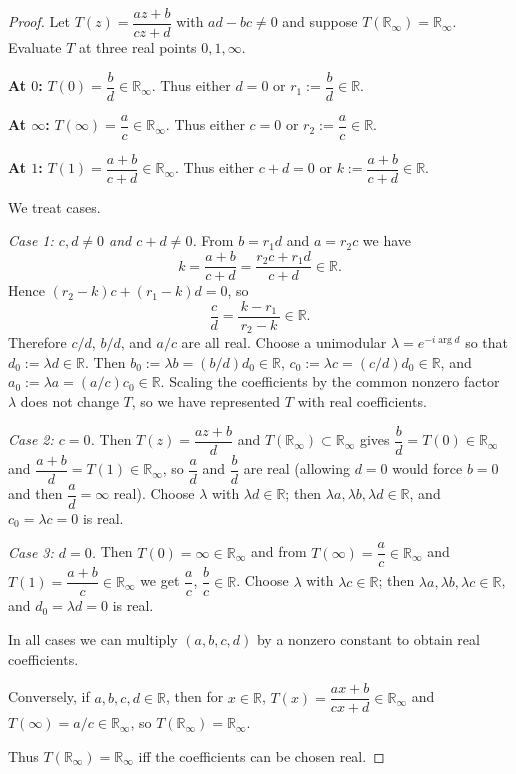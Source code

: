 \documentclass[12pt, a4paper]{report}
\theoremstyle{spaced}
\begin{document}
\begin{proof}
	Let \(T(z)=\dfrac{az+b}{cz+d}\) with \(ad-bc\neq0\) and suppose
	\(T(\mathbb{R}_\infty)=\mathbb{R}_\infty\).
	Evaluate \(T\) at three real points \(0,1,\infty\).

	\smallskip
	\textbf{At \(0\):} \quad \(T(0)=\dfrac{b}{d}\in\mathbb{R}_\infty\).
	Thus either \(d=0\) or \(r_1:=\dfrac{b}{d}\in\mathbb{R}\).

	\textbf{At \(\infty\):} \quad \(T(\infty)=\dfrac{a}{c}\in\mathbb{R}_\infty\).
	Thus either \(c=0\) or \(r_2:=\dfrac{a}{c}\in\mathbb{R}\).

	\textbf{At \(1\):} \quad \(T(1)=\dfrac{a+b}{c+d}\in\mathbb{R}_\infty\).
	Thus either \(c+d=0\) or \(k:=\dfrac{a+b}{c+d}\in\mathbb{R}\).

	We treat cases.

	\medskip
	\emph{Case 1: \(c,d\neq0\) and \(c+d\neq0\).}
	From \(b=r_1 d\) and \(a=r_2 c\) we have
	\[
		k=\frac{a+b}{c+d}=\frac{r_2 c+r_1 d}{c+d}\in\mathbb{R}.
	\]
	Hence \((r_2-k)c+(r_1-k)d=0\), so
	\[
		\frac{c}{d}=\frac{k-r_1}{\,r_2-k\,}\in\mathbb{R}.
	\]
	Therefore \(c/d\), \(b/d\), and \(a/c\) are all real.  Choose a unimodular
	\(\lambda=e^{-i\arg d}\) so that \(d_0:=\lambda d\in\mathbb{R}\).
	Then \(b_0:=\lambda b=(b/d)d_0\in\mathbb{R}\), \(c_0:=\lambda c=(c/d)d_0\in\mathbb{R}\),
	and \(a_0:=\lambda a=(a/c)c_0\in\mathbb{R}\).
	Scaling the coefficients by the common nonzero factor \(\lambda\) does not change \(T\),
	so we have represented \(T\) with real coefficients.

	\medskip
	\emph{Case 2: \(c=0\).}
	Then \(T(z)=\dfrac{az+b}{d}\) and \(T(\mathbb{R}_\infty)\subset\mathbb{R}_\infty\) gives
	\(\dfrac{b}{d}=T(0)\in\mathbb{R}_\infty\) and \(\dfrac{a+b}{d}=T(1)\in\mathbb{R}_\infty\),
	so \(\dfrac{a}{d}\) and \(\dfrac{b}{d}\) are real (allowing \(d=0\) would force \(b=0\) and then
	\(\dfrac{a}{d}=\infty\) real).
	Choose \(\lambda\) with \(\lambda d\in\mathbb{R}\); then \(\lambda a,\lambda b,\lambda d\in\mathbb{R}\),
	and \(c_0=\lambda c=0\) is real.

	\medskip
	\emph{Case 3: \(d=0\).}
	Then \(T(0)=\infty\in\mathbb{R}_\infty\) and from \(T(\infty)=\dfrac{a}{c}\in\mathbb{R}_\infty\) and
	\(T(1)=\dfrac{a+b}{c}\in\mathbb{R}_\infty\) we get \(\dfrac{a}{c}\), \(\dfrac{b}{c}\in\mathbb{R}\).
	Choose \(\lambda\) with \(\lambda c\in\mathbb{R}\); then \(\lambda a,\lambda b,\lambda c\in\mathbb{R}\),
	and \(d_0=\lambda d=0\) is real.

	\medskip
	In all cases we can multiply \((a,b,c,d)\) by a nonzero constant to obtain real coefficients.

	\medskip
	Conversely, if \(a,b,c,d\in\mathbb{R}\), then for \(x\in\mathbb{R}\),
	\(T(x)=\dfrac{ax+b}{cx+d}\in\mathbb{R}_\infty\) and \(T(\infty)=a/c\in\mathbb{R}_\infty\),
	so \(T(\mathbb{R}_\infty)=\mathbb{R}_\infty\).

	\smallskip
	Thus \(T(\mathbb{R}_\infty)=\mathbb{R}_\infty\) iff the coefficients can be chosen real.
	\qedhere
\end{proof}
\end{document}
